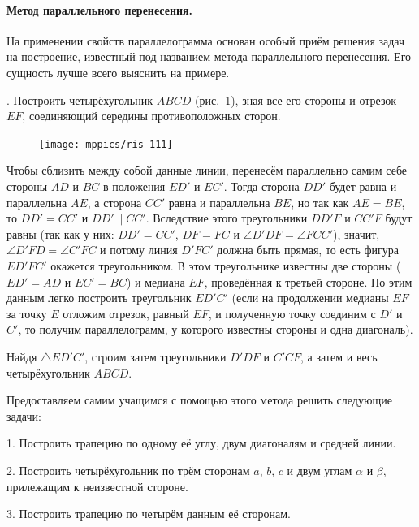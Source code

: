 \documentclass[twoside]{book}
\begin{document}
{\sloppy 

\paragraph{Метод параллельного перенесения.}\label{1938/101}
На применении свойств параллелограмма основан особый приём решения задач на построение, известный под названием метода параллельного перенесения.
Его сущность лучше всего выяснить на примере.

}

\smallskip
{}.
Построить четырёхугольник $ABCD$ (рис.~\ref{1938/ris-111}), зная все его стороны и отрезок $EF$, соединяющий середины противоположных сторон.

\begin{figure}
\centering
\texttt{[image: mppics/ris-111]}
\caption{}\label{1938/ris-111}
\end{figure}

Чтобы сблизить между собой данные линии, перенесём параллельно самим себе стороны $AD$ и $BC$ в положения $ED'$ и $EC'$.
Тогда сторона $DD'$ будет равна и параллельна $AE$, а сторона $CC'$ равна и параллельна $BE$, но так как $AE=BE$, то $DD'=CC'$ и $DD'\parallel CC'$.
Вследствие этого треугольники $DD'F$ и $CC'F$ будут равны (так как у них:
$DD' = CC'$, $DF=FC$ и $\angle D'DF=\angle FCC'$), значит, $\angle D'FD=\angle C'FC$ и потому линия $D'FC'$ должна быть прямая, то есть
фигура $ED'FC'$ окажется треугольником.
В этом треугольнике известны две стороны ($ED'=AD$ и $EC'=BC$) и медиана $EF$, проведённая к третьей стороне.
По этим данным легко построить треугольник $ED'C'$ (если на продолжении медианы $EF$ за точку $E$ отложим отрезок, равный $EF$, и полученную точку соединим с $D'$ и $C'$, то получим параллелограмм, у которого известны стороны и одна диагональ).

Найдя $\triangle ED'C'$, строим затем треугольники $D'DF$ и $C'CF$, а затем и весь четырёхугольник $ABCD$.

Предоставляем самим учащимся с помощью этого метода решить следующие задачи:

\medskip

1.
Построить трапецию по одному её углу, двум диагоналям и средней линии.

2.
Построить четырёхугольник по трём сторонам $a$, $b$, $c$ и двум углам $\alpha$ и $\beta$, прилежащим к неизвестной стороне.

3.
Построить трапецию по четырём данным её сторонам.
\end{document}
